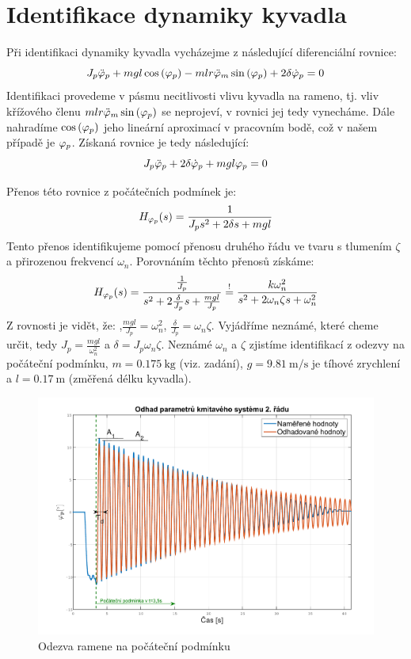 \documentclass[11pt,a4paper]{article}
\begin{document}


\section{Identifikace dynamiky kyvadla}
Při identifikaci dynamiky kyvadla vycházejme z následující diferenciální rovnice:
$$
J_p \phidd{p} + m g l \coss{\phin{p}} - m l r \phidd{m} \sinn{\phin{p}} + 2 \delta \phid{p} = 0
$$
Identifikaci provedeme v pásmu necitlivosti vlivu kyvadla na rameno, tj. vliv křížového členu  $m l r \phidd{m} \sinn{\phin{p}}$ se neprojeví, v rovnici jej tedy vynecháme. Dále nahradíme $\coss{\phin{p}}$ jeho lineární aproximací v pracovním bodě, což v našem případě je $\phin{p}$. Získaná rovnice je tedy následující:
$$
J_p \phidd{p} + 2 \delta \phid{p} + m g l \phin{p} = 0
$$


Přenos této rovnice z počátečních podmínek je: 
$$
H_{\phin{p}}(s) = \frac{1}{J_p s^2 + 2 \delta s + m g l}
$$
\newcommand{\wn}{\omega_n}
\newcommand{\ut}{\zeta} %
Tento přenos identifikujeme pomocí přenosu druhého řádu ve tvaru s tlumením $\ut$ a přirozenou frekvencí $\wn$. Porovnáním těchto přenosů získáme:
$$
H_{\phin{p}}(s) = \frac{\frac{1}{J_p}}{s^2 + 2 \frac{\delta}{J_p} s + \frac{m g l}{J_p}}
\overset{!}{=} 
\frac{k \wn^2}{s^2 + 2 \wn \ut s + \wn^2}
$$
Z rovnosti je vidět, že: ,$\frac{m g l}{J_p} = \wn^2$, $\frac{\delta}{J_p} = \wn \ut$. %
Vyjádříme neznámé, které cheme určit, tedy $J_p = \frac{m g l}{\wn^2}$ a $\delta = J_p \wn \ut$. Neznámé $\wn$ a $\ut$ zjistíme identifikací z odezvy na počáteční podmínku, $m = \SI{0,175}{\kg}$ (viz. zadání), $g = \SI{9,81}{\meter \per \second}$ je tíhové zrychlení a $l = \SI{0,17}{\metre}$ (změřená délku kyvadla).

\begin{figure}[H]
	\centering
    \includegraphics[scale=.6]{Odhad_phip.pdf}
    \caption{Odezva ramene na počáteční podmínku}
\end{figure}
\end{document}
